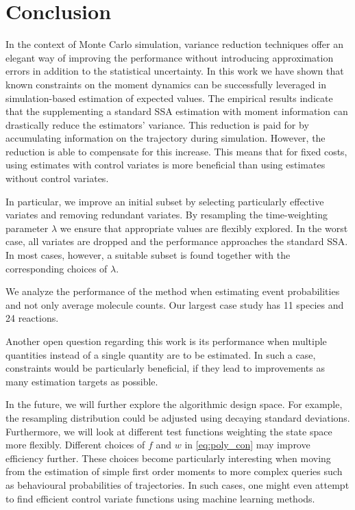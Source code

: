 \section{Conclusion}\label{sec:cv:conclusion}
In the context of Monte Carlo simulation, variance reduction
techniques offer an elegant way of improving the performance without
introducing approximation errors in addition to the statistical uncertainty.
In this work we have shown that known constraints on the moment dynamics can be successfully
leveraged in simulation-based estimation of expected values.
The empirical results indicate that
the supplementing a standard \ac{SSA} estimation with moment information
can drastically reduce the estimators' variance.
This reduction is paid for by accumulating information on the trajectory
during simulation.
However, the reduction is able to compensate for this increase.
This means that for fixed costs, using   estimates with
  control variates is more beneficial than using estimates without control variates.


In particular, we improve an initial subset by selecting particularly effective variates and removing redundant variates.
By resampling the time-weighting parameter $\lambda$ we ensure that appropriate values  are
flexibly explored.
In the worst case, all variates are dropped and the performance approaches the standard \ac{SSA}.
In most cases, however, a suitable subset is found together with the corresponding choices of $\lambda$.

We  analyze the performance of the method when estimating event probabilities and not only average molecule counts. Our largest case study has 11 species and
24 reactions. %

Another open question regarding this work is its performance when multiple
quantities instead of a single quantity are to be estimated. In such
a case, constraints would be particularly beneficial, if they lead
to improvements  as many estimation targets as possible.


In the future, we will further explore the algorithmic design space.
For example, the resampling distribution could be adjusted using decaying standard deviations.
Furthermore, we will look at different test functions weighting the state space more flexibly.
Different choices of $f$ and $w$ in \eqref{eq:poly_con} may improve 
efficiency further.
These choices become particularly interesting when moving from the estimation
of simple first order moments to more complex queries such as behavioural probabilities
of trajectories.
In such cases, one might even attempt to find efficient control variate functions
using machine learning methods.

